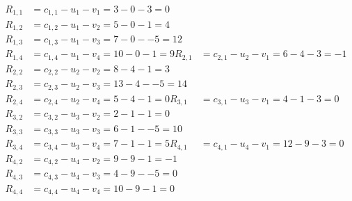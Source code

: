\[
\begin{aligned}
R_{1,1} &= c_{1,1} - u_{1} - v_{1} = 3 - 0 - 3 = 0 \\
R_{1,2} &= c_{1,2} - u_{1} - v_{2} = 5 - 0 - 1 = 4 \\
R_{1,3} &= c_{1,3} - u_{1} - v_{3} = 7 - 0 - -5 = 12 \\
R_{1,4} &= c_{1,4} - u_{1} - v_{4} = 10 - 0 - 1 = 9 
R_{2,1} &= c_{2,1} - u_{2} - v_{1} = 6 - 4 - 3 = -1 \\
R_{2,2} &= c_{2,2} - u_{2} - v_{2} = 8 - 4 - 1 = 3 \\
R_{2,3} &= c_{2,3} - u_{2} - v_{3} = 13 - 4 - -5 = 14 \\
R_{2,4} &= c_{2,4} - u_{2} - v_{4} = 5 - 4 - 1 = 0 
R_{3,1} &= c_{3,1} - u_{3} - v_{1} = 4 - 1 - 3 = 0 \\
R_{3,2} &= c_{3,2} - u_{3} - v_{2} = 2 - 1 - 1 = 0 \\
R_{3,3} &= c_{3,3} - u_{3} - v_{3} = 6 - 1 - -5 = 10 \\
R_{3,4} &= c_{3,4} - u_{3} - v_{4} = 7 - 1 - 1 = 5 
R_{4,1} &= c_{4,1} - u_{4} - v_{1} = 12 - 9 - 3 = 0 \\
R_{4,2} &= c_{4,2} - u_{4} - v_{2} = 9 - 9 - 1 = -1 \\
R_{4,3} &= c_{4,3} - u_{4} - v_{3} = 4 - 9 - -5 = 0 \\
R_{4,4} &= c_{4,4} - u_{4} - v_{4} = 10 - 9 - 1 = 0 
\end{aligned}
\]

